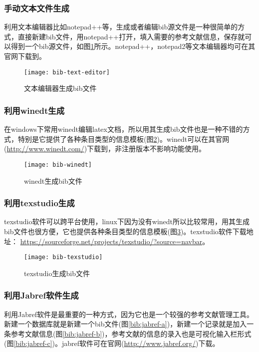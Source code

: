 \documentclass[twoside]{article} %
\begin{document}
\subsubsection{手动文本文件生成}

利用文本编辑器比如notepad++等，生成或者编辑bib源文件是一种很简单的方式，直接新建bib文件，用notepad++打开，填入需要的参考文献信息，保存就可以得到一个bib源文件，如图\ref{bib:texteditor}所示。notepad++，notepad2等文本编辑器均可在其官网下载到。

\begin{figure}[!htb]
  \centering
  \texttt{[image: bib-text-editor]}
  \caption{文本编辑器生成bib文件}\label{bib:texteditor}
\end{figure}

\subsubsection{利用winedt生成}
在windows下常用winedt编辑latex文档，所以用其生成bib文件也是一种不错的方式，特别是它提供了各种条目类型的信息模板(图\ref{bib:winedt})。winedt可以在其官网(\url{http://www.winedt.com/})下载到，非注册版本不影响功能使用。

\begin{figure}[!htb]
  \centering
  \texttt{[image: bib-winedt]}
  \caption{winedt生成bib文件}\label{bib:winedt}
\end{figure}

\subsubsection{利用texstudio生成}
texstudio软件可以跨平台使用，linux下因为没有winedt所以比较常用，用其生成bib文件也很方便，它也提供各种条目类型的信息模板(图\ref{bib:texstudio})。texstudio软件下载地址：
\url{https://sourceforge.net/projects/texstudio/?source=navbar}。

\begin{figure}[!htb]
  \centering
  \texttt{[image: bib-texstudio]}
  \caption{texstudio生成bib文件}\label{bib:texstudio}
\end{figure}

\subsubsection{利用Jabref软件生成}
利用Jabref软件是最重要的一种方式，因为它也是一个较强的参考文献管理工具。新建一个数据库就是新建一个bib文件(图\ref{bib:jabref-a})，新建一个记录就是加入一条参考文献信息(图\ref{bib:jabref-b})，参考文献的信息的录入也是可视化输入栏形式(图\ref{bib:jabref-c})。jabref软件可在官网(\url{http://www.jabref.org/})下载。
\end{document}
